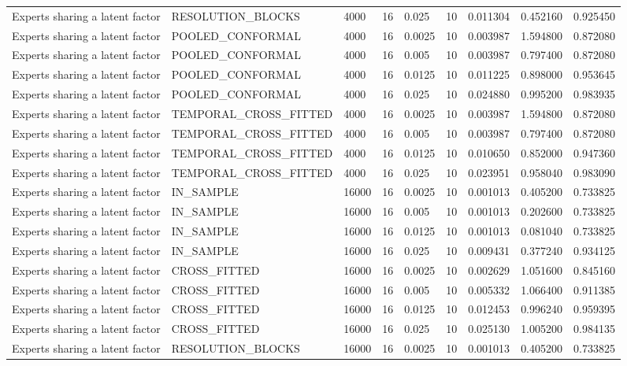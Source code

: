 \begin{tabular}{lllllllll}
Experts sharing a latent factor & RESOLUTION\_BLOCKS & 4000 & 16 & 0.025 & 10 & 0.011304 & 0.452160 & 0.925450 \\
Experts sharing a latent factor & POOLED\_CONFORMAL & 4000 & 16 & 0.0025 & 10 & 0.003987 & 1.594800 & 0.872080 \\
Experts sharing a latent factor & POOLED\_CONFORMAL & 4000 & 16 & 0.005 & 10 & 0.003987 & 0.797400 & 0.872080 \\
Experts sharing a latent factor & POOLED\_CONFORMAL & 4000 & 16 & 0.0125 & 10 & 0.011225 & 0.898000 & 0.953645 \\
Experts sharing a latent factor & POOLED\_CONFORMAL & 4000 & 16 & 0.025 & 10 & 0.024880 & 0.995200 & 0.983935 \\
Experts sharing a latent factor & TEMPORAL\_CROSS\_FITTED & 4000 & 16 & 0.0025 & 10 & 0.003987 & 1.594800 & 0.872080 \\
Experts sharing a latent factor & TEMPORAL\_CROSS\_FITTED & 4000 & 16 & 0.005 & 10 & 0.003987 & 0.797400 & 0.872080 \\
Experts sharing a latent factor & TEMPORAL\_CROSS\_FITTED & 4000 & 16 & 0.0125 & 10 & 0.010650 & 0.852000 & 0.947360 \\
Experts sharing a latent factor & TEMPORAL\_CROSS\_FITTED & 4000 & 16 & 0.025 & 10 & 0.023951 & 0.958040 & 0.983090 \\
Experts sharing a latent factor & IN\_SAMPLE & 16000 & 16 & 0.0025 & 10 & 0.001013 & 0.405200 & 0.733825 \\
Experts sharing a latent factor & IN\_SAMPLE & 16000 & 16 & 0.005 & 10 & 0.001013 & 0.202600 & 0.733825 \\
Experts sharing a latent factor & IN\_SAMPLE & 16000 & 16 & 0.0125 & 10 & 0.001013 & 0.081040 & 0.733825 \\
Experts sharing a latent factor & IN\_SAMPLE & 16000 & 16 & 0.025 & 10 & 0.009431 & 0.377240 & 0.934125 \\
Experts sharing a latent factor & CROSS\_FITTED & 16000 & 16 & 0.0025 & 10 & 0.002629 & 1.051600 & 0.845160 \\
Experts sharing a latent factor & CROSS\_FITTED & 16000 & 16 & 0.005 & 10 & 0.005332 & 1.066400 & 0.911385 \\
Experts sharing a latent factor & CROSS\_FITTED & 16000 & 16 & 0.0125 & 10 & 0.012453 & 0.996240 & 0.959395 \\
Experts sharing a latent factor & CROSS\_FITTED & 16000 & 16 & 0.025 & 10 & 0.025130 & 1.005200 & 0.984135 \\
Experts sharing a latent factor & RESOLUTION\_BLOCKS & 16000 & 16 & 0.0025 & 10 & 0.001013 & 0.405200 & 0.733825 \\

\end{tabular}
